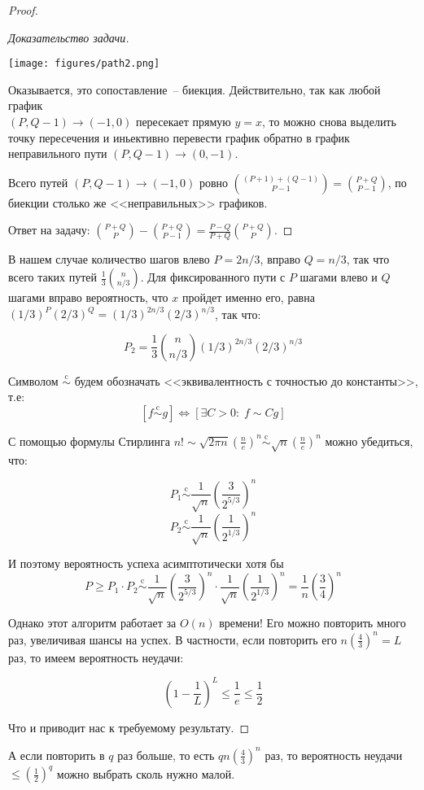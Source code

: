 \begin{proof}
\begin{proof}[Доказательство задачи]
    \begin{center}
        \texttt{[image: figures/path2.png]}
    \end{center}
    
    Оказывается, это сопоставление~-- биекция. Действительно, так как любой график \\$(P, Q-1) \rightarrow (-1, 0)$ пересекает прямую $y=x$, то можно снова выделить точку пересечения и иньективно перевести график обратно в график неправильного пути $(P, Q-1) \rightarrow (0, -1)$.
    
    Всего путей $(P, Q-1) \rightarrow (-1, 0)$ ровно ${(P+1)+(Q-1) \choose P-1} = {P+Q\choose P-1}$, по биекции столько же <<неправильных>> графиков.
    
    Ответ на задачу: ${P+Q\choose P} - {P+Q\choose P-1} = \frac{P-Q}{P+Q}{P+Q\choose P}.$
\end{proof}

В нашем случае количество шагов влево $P = 2n/3$, вправо $Q=n/3$, так что всего таких путей $\frac{1}{3}{n\choose n/3}$. Для фиксированного пути с $P$ шагами влево и $Q$ шагами вправо вероятность, что $x$ пройдет именно его, равна $(1/3)^P (2/3)^Q = (1/3)^{2n/3} (2/3)^{n/3}$, так что:

$$P_2 = \frac{1}{3} {n\choose n/3} (1/3)^{2n/3} (2/3)^{n/3}$$

\newcommand{\scm}{\overset{\text{c}}{\sim}}
Символом $\scm$ будем обозначать <<эквивалентность с точностью до константы>>, т.е: $$[f \scm g] \iff [\exists C > 0: \; f \sim Cg]$$

С помощью формулы Стирлинга $n! \sim \sqrt{2\pi n}\left(\frac{n}{e}\right)^n \scm \sqrt{n}\left(\frac{n}{e}\right)^n$ можно убедиться, что:

$$ P_1 \scm \frac{1}{\sqrt n}\left(\frac{3}{2^{5/3}}\right)^n$$
$$ P_2 \scm \frac{1}{\sqrt n}\left(\frac{1}{2^{1/3}}\right)^n$$

И поэтому вероятность успеха асимптотически хотя бы
$$P \geq P_1 \cdot P_2 \scm \frac{1}{\sqrt n}\left(\frac{3}{2^{5/3}}\right)^n \cdot \frac{1}{\sqrt n}\left(\frac{1}{2^{1/3}}\right)^n = \frac{1}{n}\left(\frac{3}{4}\right)^n$$

Однако этот алгоритм работает за $O(n)$ времени! Его можно повторить много раз, увеличивая шансы на успех. В частности, если повторить его $n\left(\frac{4}{3}\right)^n = L$ раз, то имеем вероятность неудачи:

$$\left(1-\frac{1}{L}\right)^L \leq \frac{1}{e} \leq \frac{1}{2}$$

Что и приводит нас к требуемому результату. 
\end{proof}

\begin{nb*}А если повторить в $q$ раз больше, то есть $qn\left(\frac{4}{3}\right)^n$ раз, то вероятность неудачи $\leq\left(\frac{1}{2}\right)^q$ можно выбрать сколь нужно малой.
\end{nb*}
